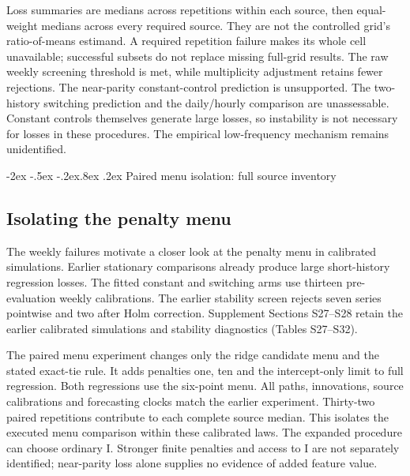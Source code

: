 \documentclass[10pt,a4paper]{article}
\makeatletter
\renewcommand\section{\@startsection{section}{1}{\z@}%
  {-2ex \@plus -.5ex \@minus -.2ex}{.8ex \@plus .2ex}%
  {\normalfont\large\bfseries}}
\makeatother
\begin{document}




Loss summaries are medians across repetitions within each source, then equal-weight medians across every required source. They are not the controlled
grid's ratio-of-means estimand. A required repetition failure makes its whole
cell unavailable; successful subsets do not replace missing full-grid results.
The raw weekly screening threshold is met, while multiplicity adjustment
retains fewer rejections. The near-parity constant-control prediction is
unsupported. The two-history switching prediction and the daily/hourly
comparison are unassessable. Constant controls themselves generate large
losses, so instability is not necessary for losses in these procedures.
The empirical low-frequency mechanism remains unidentified.

\section{Paired menu isolation: full source inventory}\label{sup:v10-menu}

\subsection{Isolating the penalty menu}\label{sec:extensions}

The weekly failures motivate a closer look at the penalty menu in calibrated simulations. Earlier stationary comparisons already produce large short-history regression losses. The fitted constant and switching arms use thirteen pre-evaluation weekly calibrations. The earlier stability screen rejects seven series pointwise and two after Holm correction. Supplement Sections S27--S28 retain the earlier calibrated simulations and stability diagnostics (Tables S27--S32).

The paired menu experiment changes only the ridge candidate menu and the stated exact-tie rule. It adds penalties one, ten and the intercept-only limit to full regression. Both regressions use the six-point menu. All paths, innovations, source calibrations and forecasting clocks match the earlier experiment. Thirty-two paired repetitions contribute to each complete source median. This isolates the executed menu comparison within these calibrated laws. The expanded procedure can choose ordinary I. Stronger finite penalties and access to I are not separately identified; near-parity loss alone supplies no evidence of added feature value.
\end{document}
